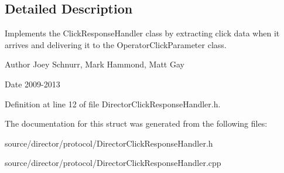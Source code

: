 \subsection{Detailed Description}
Implements the Click\-Response\-Handler class by extracting click data when it arrives and delivering it to the Operator\-Click\-Parameter class. 

\begin{DoxyAuthor}{Author}
Joey Schnurr, Mark Hammond, Matt Gay 
\end{DoxyAuthor}
\begin{DoxyDate}{Date}
2009-\/2013 
\end{DoxyDate}


Definition at line 12 of file Director\-Click\-Response\-Handler.\-h.



The documentation for this struct was generated from the following files\-:\begin{DoxyCompactItemize}
\item 
source/director/protocol/Director\-Click\-Response\-Handler.\-h\item 
source/director/protocol/Director\-Click\-Response\-Handler.\-cpp\end{DoxyCompactItemize}
